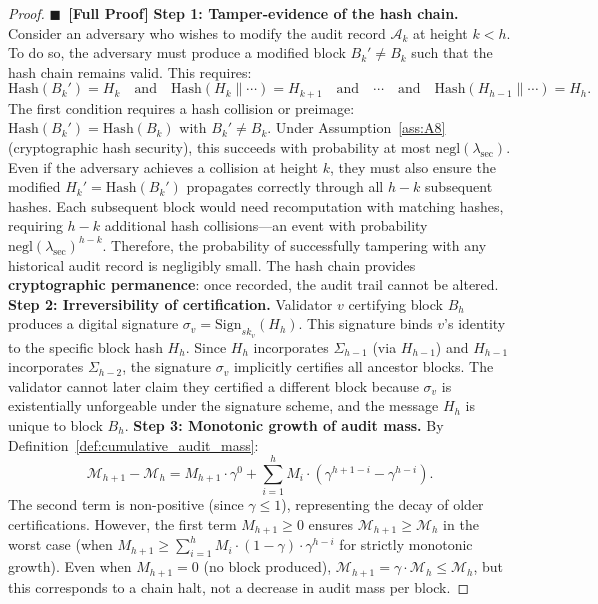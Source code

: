 \documentclass[11pt,a4paper]{article}
\theoremstyle{definition}
\newcommand{\rigorFull}[0]{$\blacksquare$~\textbf{[Full Proof]}}
\begin{document}
\begin{proof}\rigorFull
\textbf{Step 1: Tamper-evidence of the hash chain.} Consider an adversary who wishes to modify the audit record $\mathcal{A}_k$ at height $k < h$. To do so, the adversary must produce a modified block $B_k' \neq B_k$ such that the hash chain remains valid. This requires:
\begin{equation}
    \mathrm{Hash}(B_k') = H_k \quad \text{and} \quad \mathrm{Hash}(H_k \parallel \cdots) = H_{k+1} \quad \text{and} \quad \cdots \quad \text{and} \quad \mathrm{Hash}(H_{h-1} \parallel \cdots) = H_h.
    \label{eq:tamper_requirements}
\end{equation}
The first condition requires a hash collision or preimage: $\mathrm{Hash}(B_k') = \mathrm{Hash}(B_k)$ with $B_k' \neq B_k$. Under Assumption~\ref{ass:A8} (cryptographic hash security), this succeeds with probability at most $\mathrm{negl}(\lambda_{\mathrm{sec}})$. Even if the adversary achieves a collision at height $k$, they must also ensure the modified $H_k' = \mathrm{Hash}(B_k')$ propagates correctly through all $h-k$ subsequent hashes. Each subsequent block would need recomputation with matching hashes, requiring $h-k$ additional hash collisions—an event with probability $\mathrm{negl}(\lambda_{\mathrm{sec}})^{h-k}$.
Therefore, the probability of successfully tampering with any historical audit record is negligibly small. The hash chain provides \textbf{cryptographic permanence}: once recorded, the audit trail cannot be altered.
\textbf{Step 2: Irreversibility of certification.} Validator $v$ certifying block $B_h$ produces a digital signature $\sigma_v = \mathrm{Sign}_{sk_v}(H_h)$. This signature binds $v$'s identity to the specific block hash $H_h$. Since $H_h$ incorporates $\Sigma_{h-1}$ (via $H_{h-1}$) and $H_{h-1}$ incorporates $\Sigma_{h-2}$, the signature $\sigma_v$ implicitly certifies all ancestor blocks. The validator cannot later claim they certified a different block because $\sigma_v$ is existentially unforgeable under the signature scheme, and the message $H_h$ is unique to block $B_h$.
\textbf{Step 3: Monotonic growth of audit mass.} By Definition~\ref{def:cumulative_audit_mass}:
\begin{equation}
    \mathcal{M}_{h+1} - \mathcal{M}_h = M_{h+1} \cdot \gamma^{0} + \sum_{i=1}^{h} M_i \cdot (\gamma^{h+1-i} - \gamma^{h-i}).
    \label{eq:audit_delta}
\end{equation}
The second term is non-positive (since $\gamma \leq 1$), representing the decay of older certifications. However, the first term $M_{h+1} \geq 0$ ensures $\mathcal{M}_{h+1} \geq \mathcal{M}_h$ in the worst case (when $M_{h+1} \geq \sum_{i=1}^{h} M_i \cdot (1-\gamma) \cdot \gamma^{h-i}$ for strictly monotonic growth). Even when $M_{h+1} = 0$ (no block produced), $\mathcal{M}_{h+1} = \gamma \cdot \mathcal{M}_h \leq \mathcal{M}_h$, but this corresponds to a chain halt, not a decrease in audit mass per block.

\end{proof}
\end{document}
